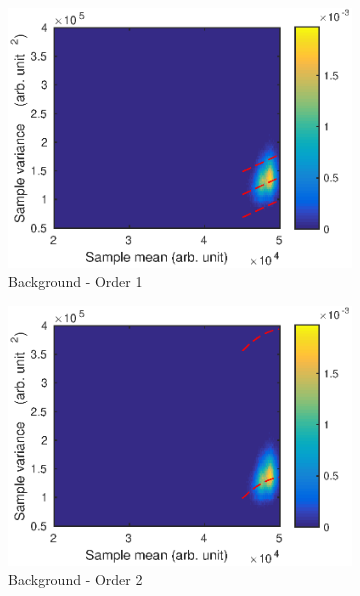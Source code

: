 \documentclass[12pt]{report}
\begin{document}
\begin{figure}
\begin{subfigure}{0.45\textwidth}
		\includegraphics[width=\textwidth]{figures/meanVar/subsample_background1.eps}
		\caption{Background - Order 1}
	\end{subfigure}
	\begin{subfigure}{0.45\textwidth}
		\includegraphics[width=\textwidth]{figures/meanVar/subsample_background2.eps}
		\caption{Background - Order 2}
	\end{subfigure}
	\begin{subfigure}{0.45\textwidth}

\end{subfigure}
\end{figure}
\end{document}
